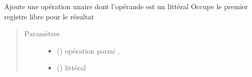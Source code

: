 \documentclass[letterpaper,10pt,french]{sphinxmanual}
\begin{document}
\begin{fulllineitems}
\begin{fulllineitems}
\begin{quote}
\begin{description}
\end{description}\end{quote}

\end{fulllineitems}


\begin{fulllineitems}
\label{\detokenize{compileexpressionmanager:compileexpressionmanager.CompileExpressionManager.pushUnaryOperatorWithLitteral}}
Ajoute une opération unaire dont l’opérande est un littéral
Occupe le premier registre libre pour le résultat
\begin{quote}\begin{description}
\item[{Paramètres}] \leavevmode\begin{itemize}
\item {} 
 () \textendash{} opération parmi \sphinxcode{\sphinxupquote{\textasciitilde{}}}, \sphinxcode{\sphinxupquote{\sphinxhyphen{}}}

\item {} 
 ({\hyperref[\detokenize{litteral:litteral.Litteral}]{}}) \textendash{} littéral

\end{itemize}

\end{description}\end{quote}

\end{fulllineitems}



\end{fulllineitems}
\end{document}
